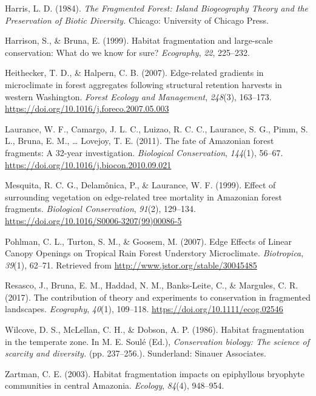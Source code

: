 \documentclass[
  man]{apa6}
\newlength{\cslhangindent}
\newenvironment{CSLReferences}[2] %
 {\begin{list}{}{%
  \setlength{\itemindent}{0pt}
  \setlength{\leftmargin}{0pt}
  \setlength{\parsep}{0pt}
  \ifodd #1
   \setlength{\leftmargin}{\cslhangindent}
   \setlength{\itemindent}{-1\cslhangindent}
  \fi
  \setlength{\itemsep}{#2\baselineskip}}}
 {\end{list}}
\begin{document}
\begin{CSLReferences}{1}{0}
Harris, L. D. (1984). \emph{The {Fragmented} {Forest}: {Island} {Biogeography} {Theory} and the {Preservation} of {Biotic} {Diversity}.} Chicago: University of Chicago Press.

Harrison, S., \& Bruna, E. (1999). Habitat fragmentation and large-scale conservation: What do we know for sure? \emph{Ecography}, \emph{22}, 225--232.

Heithecker, T. D., \& Halpern, C. B. (2007). Edge-related gradients in microclimate in forest aggregates following structural retention harvests in western {Washington}. \emph{Forest Ecology and Management}, \emph{248}(3), 163--173. \url{https://doi.org/10.1016/j.foreco.2007.05.003}

Laurance, W. F., Camargo, J. L. C., Luizao, R. C. C., Laurance, S. G., Pimm, S. L., Bruna, E. M., \ldots{} Lovejoy, T. E. (2011). The fate of {Amazonian} forest fragments: {A} 32-year investigation. \emph{Biological Conservation}, \emph{144}(1), 56--67. \url{https://doi.org/10.1016/j.biocon.2010.09.021}

Mesquita, R. C. G., Delamônica, P., \& Laurance, W. F. (1999). Effect of surrounding vegetation on edge-related tree mortality in {Amazonian} forest fragments. \emph{Biological Conservation}, \emph{91}(2), 129--134. \url{https://doi.org/10.1016/S0006-3207(99)00086-5}

Pohlman, C. L., Turton, S. M., \& Goosem, M. (2007). Edge {Effects} of {Linear} {Canopy} {Openings} on {Tropical} {Rain} {Forest} {Understory} {Microclimate}. \emph{Biotropica}, \emph{39}(1), 62--71. Retrieved from \url{http://www.jstor.org/stable/30045485}

Resasco, J., Bruna, E. M., Haddad, N. M., Banks-Leite, C., \& Margules, C. R. (2017). The contribution of theory and experiments to conservation in fragmented landscapes. \emph{Ecography}, \emph{40}(1), 109--118. \url{https://doi.org/10.1111/ecog.02546}

Wilcove, D. S., McLellan, C. H., \& Dobson, A. P. (1986). Habitat fragmentation in the temperate zone. In M. E. Soulé (Ed.), \emph{Conservation biology: {The} science of scarcity and diversity.} (pp. 237--256.). Sunderland: Sinauer Associates.

Zartman, C. E. (2003). Habitat fragmentation impacts on epiphyllous bryophyte communities in central {Amazonia}. \emph{Ecology}, \emph{84}(4), 948--954.

\end{CSLReferences}
\end{document}
